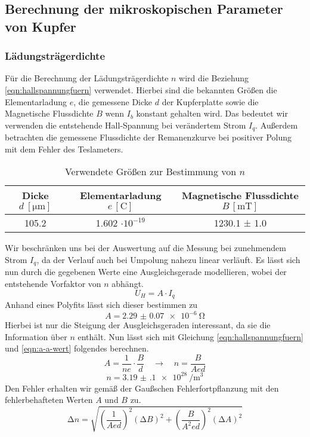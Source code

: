 \subsection{Berechnung der mikroskopischen Parameter von Kupfer}
\subsubsection{Lädungsträgerdichte}
Für die Berechnung der Lädungsträgerdichte $n$ wird die Beziehung \eqref{eqn:hallspannungfuern} verwendet. Hierbei sind die 
bekannten Größen die Elementarladung $e$, die gemessene Dicke $d$ der Kupferplatte sowie die Magnetische Flussdichte $B$ wenn $I_{b}$ konstant gehalten wird.
Das bedeutet wir verwenden die entstehende Hall-Spannung bei verändertem Strom $I_{q}$.
Außerdem betrachten die gemessene Flussdichte der Remanenzkurve bei positiver Polung mit dem Fehler des Teslameters.
\begin{table}
  \centering
  \caption{Verwendete Größen zur Bestimmung von $n$}
  \label{tab:nbestimmung}
  \begin{tabular}{c c c}
    Dicke {$d \: [\si{\micro\meter}]$} & Elementarladung $e \, [\si{\coulomb}]$ & Magnetische Flussdichte $B \, [\si{\milli\tesla}]$ \\
    \midrule
    105.2   & 1.602 $\cdot 10^{-19}$ & 1230.1 ± 1.0 \\
    \bottomrule
  \end{tabular}
\end{table}
Wir beschränken uns bei der Auswertung auf die Messung bei zunehmendem Strom ${I_{q}}$, da der Verlauf auch bei Umpolung nahezu linear verläuft.
Es lässt sich nun durch die gegebenen Werte eine Ausgleichsgerade modellieren, wobei der entstehende Vorfaktor von $n$ abhängt.
\begin{equation}
U_{H} = A \cdot I_{q}
\end{equation}
Anhand eines Polyfits lässt sich dieser bestimmen zu
\begin{equation}
\label{eqn:a-a-wert}
A = \SI{2.29(7)e-6}{\ohm}
\end{equation}
Hierbei ist nur die Steigung der Ausgleichsgeraden interessant, da sie die Information über $n$ enthält.
Nun lässt sich mit Gleichung \eqref{eqn:hallspannungfuern} und \eqref{eqn:a-a-wert} folgendes berechnen.
\begin{equation}
A = \frac{1}{n e} \cdot \frac{B}{d} \quad \to \quad n = \frac{B}{Aed}
\end{equation}
\begin{equation}
\label{eqn:nwert}
n = \SI{3.19(10)e28}{\per\meter\cubed}
\end{equation}
Den Fehler erhalten wir gemäß der Gaußschen Fehlerfortpflanzung mit den fehlerbehafteten Werten $A$ und $B$ zu.
\begin{equation}
\increment n = \sqrt{\left( \frac{1}{A e d}\right)^{2} (\increment B)^{2} + \left( \frac{B}{A^{2} e d}\right)^{2} (\increment A)^{2}}
\end{equation}
